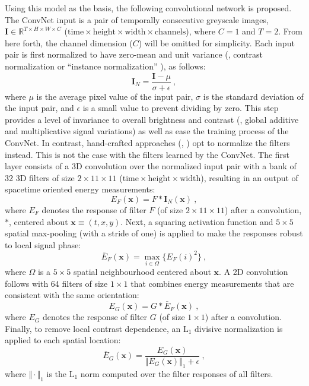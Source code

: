 Using this model as the basis, the following convolutional 
network is proposed.
The ConvNet input is a pair of temporally consecutive greyscale images, $\mathbf{I} \in \mathbb{R}^{T \times H \times W \times C}$ ($\text{time} \times \text{height} \times \text{width} \times \text{channels}$), where $C=1$ and $T=2$. From here forth, the channel dimension ($C$) will be omitted for simplicity.
Each input pair is first normalized to have zero-mean and unit
variance (\ie, contrast normalization or ``instance normalization'' \cite{ulyanov2017}), as follows:
\begin{equation}
	\mathbf{I}_N = \frac{\mathbf{I} - \mu}{\sigma + \epsilon}\ ,
\end{equation}
where $\mu$ is the average pixel value of the input pair, $\sigma$ is the standard deviation of the input pair, and $\epsilon$ is a small value to prevent dividing by zero.
This step provides a level of invariance to overall brightness and contrast (\ie, global additive and
multiplicative signal variations) as well as ease the training process of the ConvNet. In contrast, hand-crafted approaches (\eg, \cite{derpanis2012spacetime}) opt to normalize the filters instead. This is not the case with the filters learned by the ConvNet.
The first layer consists of a 3D convolution over the normalized input pair with a bank of 32 3D filters of size $2 \times 11 \times 11$
($\text{time} \times \text{height} \times \text{width}$), resulting in an output of spacetime oriented energy measurements:
\begin{equation}
	E_F(\mathbf{x}) = F * \mathbf{I}_N(\mathbf{x})\ ,
\end{equation}
where $E_F$ denotes the response of filter $F$ (of size $2 \times 11 \times 11$) after a convolution, $*$, centered about $\mathbf{x} \equiv (t, x, y)$.
Next, a squaring activation function and $5 \times 5$
spatial max-pooling (with a stride of one) is applied to
make the responses robust to local signal phase:
\begin{equation}
	\bar{E}_F(\mathbf{x}) = \max_{i\in\Omega}\{E_F(i)^2\}\ ,
\end{equation}
where $\Omega$ is a $5 \times 5$ spatial neighbourhood centered about $\mathbf{x}$.
A 2D convolution follows with 64 filters of size $1 \times 1$ that combines
energy measurements that are consistent
with the same orientation:
\begin{equation}
	E_G(\mathbf{x}) = G * \bar{E}_F(\mathbf{x})\ ,
\end{equation}
where  $E_G$ denotes the response of filter $G$ (of size $1 \times 1$) after a convolution.
Finally, to remove local contrast dependence, an
$\text{L}_1$ divisive normalization is applied to each spatial location:
\begin{equation}
	\bar{E}_G(\mathbf{x}) = \frac{E_G(\mathbf{x})}{\Vert E_G(\mathbf{x}) \Vert_1 + \epsilon}\ ,
\end{equation}
where $\Vert \cdot \Vert_1$ is the $\text{L}_1$ norm computed over the filter responses of all filters.

